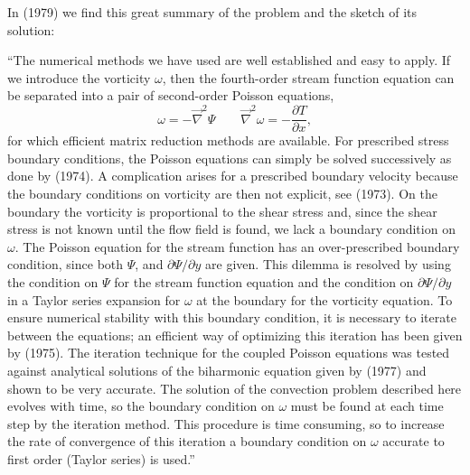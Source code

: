 In \textcite{ludt79} (1979) we find this great summary of the problem 
and the sketch of its solution:
\begin{displayquote}
{\color{darkgray}
``The numerical methods we have used are well established and easy to apply. If we introduce
the vorticity $\omega$, then the fourth-order stream function equation can be
separated into a pair of second-order Poisson equations,
\[
\omega = -\vec\nabla^2 \Psi 
\qquad
\vec\nabla^2 \omega = -\frac{\partial T}{\partial x},
\]
for which efficient matrix reduction methods are available. 
For prescribed stress boundary conditions, the Poisson equations can simply
be solved successively as done by \textcite{mcrw74} (1974). 
A complication arises for a prescribed boundary velocity because the boundary conditions on vorticity are then not
explicit, see \textcite{rich73} (1973). On the boundary the vorticity is proportional to the shear stress
and, since the shear stress is not known until the flow field is found, we lack a boundary
condition on $\omega$. The Poisson equation for the stream function has an over-prescribed
boundary condition, since both $\Psi$, and $\partial\Psi/\partial y$ are given. 
This dilemma is resolved by using
the condition on $\Psi$ for the stream function equation and the condition on $\partial\Psi/\partial y$ in a
Taylor series expansion for $\omega$ at the boundary for the vorticity equation. To ensure
numerical stability with this boundary condition, it is necessary to iterate between the
equations; an efficient way of optimizing this iteration has been given by \textcite{ehgu75} (1975). The iteration technique for the coupled Poisson equations was tested against
analytical solutions of the biharmonic equation given by \textcite{davi77} (1977) 
and shown to be very accurate. The solution of the convection problem described here evolves 
with time, so the boundary condition on $\omega$ must be found at each time step by the iteration method.
This procedure is time consuming, so to increase the rate of convergence of this iteration a
boundary condition on $\omega$ accurate to first order (Taylor series) is used.''
}
\end{displayquote}

